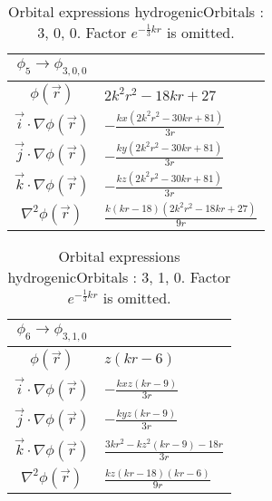 \begin{table}
\begin{center}
\begin{tabular}{c|l}
$\phi_{5} \rightarrow \phi_{3, 0, 0}$\\
\hline
$\phi(\vec r)$ & $2 k^{2} r^{2} - 18 k r + 27$\\
\hline
$\vec i\cdot \nabla \phi(\vec r)$ & $- \frac{k x \left(2 k^{2} r^{2} - 30 k r + 81\right)}{3 r}$\\
$\vec j\cdot \nabla \phi(\vec r)$ & $- \frac{k y \left(2 k^{2} r^{2} - 30 k r + 81\right)}{3 r}$\\
$\vec k\cdot \nabla \phi(\vec r)$ & $- \frac{k z \left(2 k^{2} r^{2} - 30 k r + 81\right)}{3 r}$\\
\hline
$\nabla^2 \phi(\vec r)$ & $\frac{k \left(k r -18\right) \left(2 k^{2} r^{2} - 18 k r + 27\right)}{9 r}$\\
\end{tabular}
\caption{Orbital expressions hydrogenicOrbitals : 3, 0, 0. Factor $e^{- \frac{1}{3} k r}$ is omitted.}
\end{center}
\end{table}


\begin{table}
\begin{center}
\begin{tabular}{c|l}
$\phi_{6} \rightarrow \phi_{3, 1, 0}$\\
\hline
$\phi(\vec r)$ & $z \left(k r -6\right)$\\
\hline
$\vec i\cdot \nabla \phi(\vec r)$ & $- \frac{k x z \left(k r -9\right)}{3 r}$\\
$\vec j\cdot \nabla \phi(\vec r)$ & $- \frac{k y z \left(k r -9\right)}{3 r}$\\
$\vec k\cdot \nabla \phi(\vec r)$ & $\frac{3 k r^{2} - k z^{2} \left(k r -9\right) - 18 r}{3 r}$\\
\hline
$\nabla^2 \phi(\vec r)$ & $\frac{k z \left(k r -18\right) \left(k r -6\right)}{9 r}$\\
\end{tabular}
\caption{Orbital expressions hydrogenicOrbitals : 3, 1, 0. Factor $e^{- \frac{1}{3} k r}$ is omitted.}
\end{center}
\end{table}


